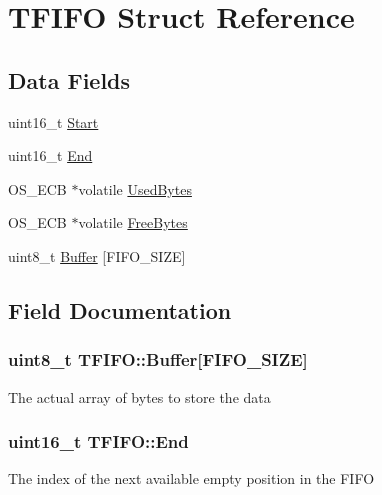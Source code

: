 \hypertarget{struct_t_f_i_f_o}{}\section{T\+F\+I\+F\+O Struct Reference}
\label{struct_t_f_i_f_o}
\subsection*{Data Fields}
\begin{DoxyCompactItemize}
\item 
uint16\+\_\+t \hyperlink{struct_t_f_i_f_o_a092a7559431a12616672354641908167}{Start}
\item 
uint16\+\_\+t \hyperlink{struct_t_f_i_f_o_a5063b875898a6f23a97aa3ca17f0544b}{End}
\item 
O\+S\+\_\+\+E\+C\+B $\ast$volatile \hyperlink{struct_t_f_i_f_o_a09fb01c841ada97865836c05b29ddb06}{Used\+Bytes}
\item 
O\+S\+\_\+\+E\+C\+B $\ast$volatile \hyperlink{struct_t_f_i_f_o_aec98d2c207d848180771f62f2ca7c6e7}{Free\+Bytes}
\item 
uint8\+\_\+t \hyperlink{struct_t_f_i_f_o_a5a9d712880dc4f1d5571b96452cd85f8}{Buffer} \mbox{[}F\+I\+F\+O\+\_\+\+S\+I\+Z\+E\mbox{]}
\end{DoxyCompactItemize}


\subsection{Field Documentation}
\hypertarget{struct_t_f_i_f_o_a5a9d712880dc4f1d5571b96452cd85f8}{}
\subsubsection[{Buffer}]{\setlength{\rightskip}{0pt plus 5cm}uint8\+\_\+t T\+F\+I\+F\+O\+::\+Buffer\mbox{[}F\+I\+F\+O\+\_\+\+S\+I\+Z\+E\mbox{]}}\label{struct_t_f_i_f_o_a5a9d712880dc4f1d5571b96452cd85f8}
The actual array of bytes to store the data \hypertarget{struct_t_f_i_f_o_a5063b875898a6f23a97aa3ca17f0544b}{}
\subsubsection[{End}]{\setlength{\rightskip}{0pt plus 5cm}uint16\+\_\+t T\+F\+I\+F\+O\+::\+End}\label{struct_t_f_i_f_o_a5063b875898a6f23a97aa3ca17f0544b}
The index of the next available empty position in the F\+I\+F\+O \hypertarget{struct_t_f_i_f_o_aec98d2c207d848180771f62f2ca7c6e7}{}
